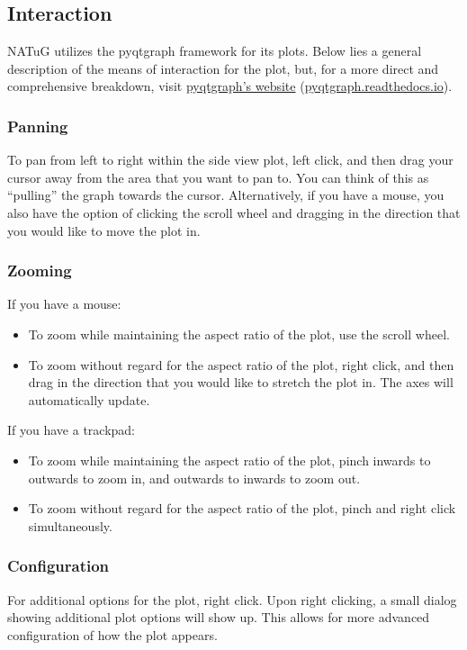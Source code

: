 \documentclass[titlepage]{article}
\begin{document}
	\subsection{Interaction}
	NATuG utilizes the pyqtgraph framework for its plots. Below lies a general description of the means of interaction for the plot, but, for a more direct and comprehensive breakdown, visit \href{https://pyqtgraph.readthedocs.io/en/latest/user_guide/mouse_interaction.html}{pyqtgraph’s website} (\href{https://pyqtgraph.readthedocs.io/en/latest/user_guide/mouse_interaction.html}{pyqtgraph.readthedocs.io}).
	
	\subsubsection{Panning}
	To pan from left to right within the side view plot, left click, and then drag your cursor away from the area that you want to pan to. You can think of this as “pulling” the graph towards the cursor. Alternatively, if you have a mouse, you also have the option of clicking the scroll wheel and dragging in the direction that you would like to move the plot in.
	
	\subsubsection{Zooming}
	If you have a mouse:
	\begin{itemize}
		\item To zoom while maintaining the aspect ratio of the plot, use the scroll wheel.
		\item To zoom without regard for the aspect ratio of the plot, right click, and then drag in the direction that you would like to stretch the plot in. The axes will automatically update.
	\end{itemize}
	
	If you have a trackpad:
	\begin{itemize}
		\item To zoom while maintaining the aspect ratio of the plot, pinch inwards to outwards to zoom in, and outwards to inwards to zoom out.
		\item To zoom without regard for the aspect ratio of the plot, pinch and right click simultaneously. 
	\end{itemize}

	\subsubsection{Configuration}
	For additional options for the plot, right click. Upon right clicking, a small dialog showing additional plot options will show up. This allows for more advanced configuration of how the plot appears.
	
\end{document}
